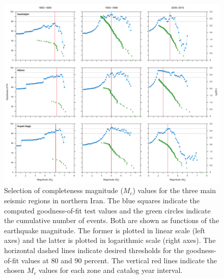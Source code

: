 {\begin{figure}[t]
    \centering
    \includegraphics[width=\textwidth]{figures/pdf/figure-06.pdf} 
    \caption{Selection of completeness magnitude ($M_c$) values for the three main seismic regions in northern Iran. The blue squares indicate the computed goodness-of-fit test values and the green circles indicate the cumulative number of events. Both are shown as functions of the earthquake magnitude. The former is plotted in linear scale (left axes) and the latter is plotted in logarithmic scale (right axes). The horizontal dashed lines indicate desired thresholds for the goodness-of-fit values at 80 and 90 percent. The vertical red lines indicate the chosen $M_c$ values for each zone and catalog year interval.}
    \label{fig:mc}
\end{figure}

}
